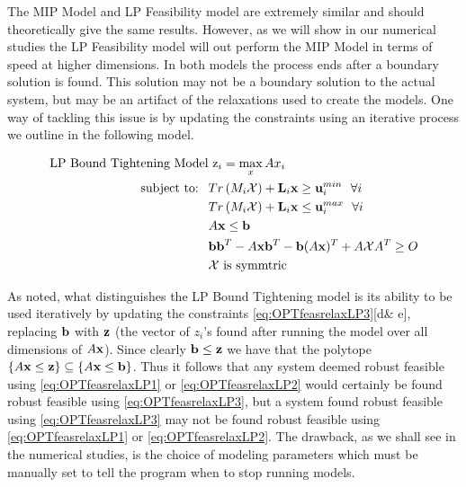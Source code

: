 The MIP Model and LP Feasibility model are extremely similar and should theoretically give the same results. 
However, as we will show in our numerical studies the LP Feasibility model will out perform the MIP Model in terms of speed at higher dimensions. 
In both models the process ends after a boundary solution is found. 
This solution may not be a boundary solution to the actual system, but may be an artifact of the relaxations used to create the models. 
One way of tackling this issue is by updating the constraints using an iterative process we outline in the following model.
 
\begin{subequations}\label{eq:OPTfeasrelaxLP3}
\begin{align}
\text{LP Bound Tightening Model}& \ \mathrm{z}_{i} = \max_x Ax_i  \\
 \text{subject to: } \ &Tr\left(M_i\mathcal{X}\right)+\bold L_i\bold x \geq \bold u_i^{min}  \ \ \forall i\\
 & Tr\left(M_i\mathcal{X}\right)+\bold L_i\bold x \leq \bold u_i^{max}  \ \ \forall i\\
 	&A\bold x\leq \bold b \\
 	&\bold b\bold b^T-A\bold x\bold b^T-\bold b(A\bold x)^T+A\mathcal{X}A^T\geq O \\
 	&\mathcal{X} \text{ is symmtric}
\end{align}
\end{subequations}

As noted, what distinguishes the LP Bound Tightening model is its ability to be used iteratively by updating the constraints \eqref{eq:OPTfeasrelaxLP3}[d\& e], replacing $\bold b$ with $\bold z$ (the vector of $z_i$'s found after running the model over all dimensions of $A\bold x$). 
Since clearly $\bold b\leq \bold z$ we have that the polytope $\{A\bold x\leq \bold z\}\subseteq\{A\bold x\leq \bold b\}$. 
Thus it follows that any system deemed robust feasible using \eqref{eq:OPTfeasrelaxLP1} or \eqref{eq:OPTfeasrelaxLP2} would certainly be found robust feasible using \eqref{eq:OPTfeasrelaxLP3}, but a system found robust feasible using \eqref{eq:OPTfeasrelaxLP3} may not be found robust feasible using \eqref{eq:OPTfeasrelaxLP1} or \eqref{eq:OPTfeasrelaxLP2}. 
The drawback, as we shall see in the numerical studies, is the choice of modeling parameters which must be manually set to tell the program when to stop running models. 

